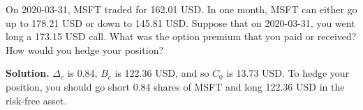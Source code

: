 \noindent On 2020-03-31, MSFT traded for 162.01 USD. In one month, MSFT can either go up to 178.21 USD or down to 145.81 USD. Suppose that on 2020-03-31, you went long a 173.15 USD call. What was the option premium that you paid or received? How would you hedge your position?

\vspace{9pt}

\noindent\textbf{Solution.} $\Delta_{c}$ is 0.84, $B_{c}$ is 122.36 USD, and so $C_{0}$ is 13.73 USD. To hedge your position, you should go short 0.84 shares of MSFT and long 122.36 USD in the risk-free asset.
